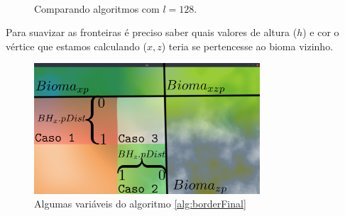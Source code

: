 \begin{figure}[H]
     \centering
     \hspace{0.1cm}
     \\
     \caption{Comparando algoritmos com $l=128$.}
     
     \label{fig:borderlenanotherauxyeahaboveonly}
\end{figure}

Para suavizar as fronteiras é preciso saber quais valores de altura ($h$) e cor o
vértice que estamos calculando ($x, z$) teria se pertencesse ao bioma vizinho.

\begin{figure}[H]
    \centering
    \includegraphics[width=0.75\textwidth]{figuras/border/yeah.png}
    \caption{Algumas variáveis do algoritmo \ref{alg:borderFinal}}
    \label{fig:paralgborder}
\end{figure}

